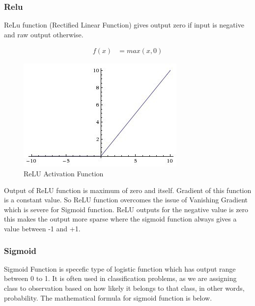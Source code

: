 \subsubsection{Relu}

ReLu function (Rectified Linear Function) gives output zero if input is
negative and raw output otherwise.

\begin{align*}
f(x)&= max(x,0)
\end{align*}

\begin{figure}[!ht]
        \centering\includegraphics[width=\columnwidth]
        {images/relu-activation-function.jpeg}
        \caption{ReLU Activation Function}\label{s:ReLU-function}
\end{figure}

Output of ReLU function is maximum of zero and itself. Gradient of this function
is a constant value. So ReLU function overcomes the issue of Vanishing Gradient
which is severe for Sigmoid function. ReLU outputs for the negative value is
zero this makes the output more sparse where the sigmoid function always gives a
value between -1 and +1.


\subsubsection{Sigmoid}

Sigmoid Function is specefic type of logistic function which has output range
between 0 to 1. It is often used in classification problems, as we are
assigning class to observation based on how likely it belongs to that class,
in other words, probability. The mathematical formula for sigmoid function is
below.

